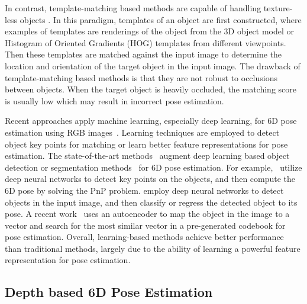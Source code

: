 \documentclass[twocolumn]{svjour3}
\begin{document}
In contrast, template-matching based methods are capable of handling texture-less objects \citep{jurie2001real,liu2010fast,gu2010discriminative,hinterstoisser2012gradient}. In this paradigm, templates of an object are first constructed, where examples of templates are renderings of the object from the 3D object model or Histogram of Oriented Gradients (HOG) \citep{dalal2005histograms} templates from different viewpoints. Then these templates are matched against the input image to determine the location and orientation of the target object in the input image. The drawback of template-matching based methods is that they are not robust to occlusions between objects. When the target object is heavily occluded, the matching score is usually low which may result in incorrect pose estimation.


Recent approaches apply machine learning, especially deep learning, for 6D pose estimation using RGB images~\citep{Brachmann2014Learning6O,krull2015learning}. Learning techniques are employed to detect object key points for matching or learn better feature representations for pose estimation. The state-of-the-art methods~\citep{rad2017bb8,kehl2017ssd,tekin2017real,xiang2017posecnn,tremblay2018deep} augment deep learning based object detection or segmentation methods~\citep{girshick2015fast,long2015fully,liu2016ssd,redmon2016you} for 6D pose estimation. For example,~\citep{rad2017bb8,tjaden2017real,tremblay2018deep} utilize deep neural networks to detect key points on the objects, and then compute the 6D pose by solving the PnP problem. \citep{kehl2017ssd,xiang2017posecnn} employ deep neural networks to detect objects in the input image, and then classify or regress the detected object to its pose.  A recent work~\citep{sundermeyer2018implicit} uses an autoencoder to map the object in the image to a vector and search for the most similar vector in a pre-generated codebook for pose estimation. Overall, learning-based methods achieve better performance than traditional methods, largely due to the ability of learning a powerful feature representation for pose estimation. 


\subsection{Depth based 6D Pose Estimation}
\end{document}
